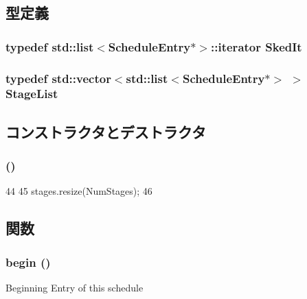 \subsection{型定義}
\hypertarget{classResourceSked_ab2a9eec675af76477619cacd99ea5225}{
\subsubsection[{SkedIt}]{\setlength{\rightskip}{0pt plus 5cm}typedef {\bf std::list}$<${\bf ScheduleEntry}$\ast$$>$::iterator {\bf SkedIt}}}
\label{classResourceSked_ab2a9eec675af76477619cacd99ea5225}
\hypertarget{classResourceSked_acd54846efdfb59f7183a9ecc11ebdbdb}{
\subsubsection[{StageList}]{\setlength{\rightskip}{0pt plus 5cm}typedef {\bf std::vector}$<${\bf std::list}$<${\bf ScheduleEntry}$\ast$$>$ $>$ {\bf StageList}}}
\label{classResourceSked_acd54846efdfb59f7183a9ecc11ebdbdb}


\subsection{コンストラクタとデストラクタ}
\hypertarget{classResourceSked_aaaf7785027bb745b7d1e41dd0da8767a}{
\subsubsection[{ResourceSked}]{ ()}}
\label{classResourceSked_aaaf7785027bb745b7d1e41dd0da8767a}



\begin{DoxyCode}
44 {
45     stages.resize(NumStages);
46 }
\end{DoxyCode}


\subsection{関数}
\hypertarget{classResourceSked_a7227fc077388658a1be7f6cae404798b}{
\subsubsection[{begin}]{ begin ()}}
\label{classResourceSked_a7227fc077388658a1be7f6cae404798b}
Beginning Entry of this schedule 


